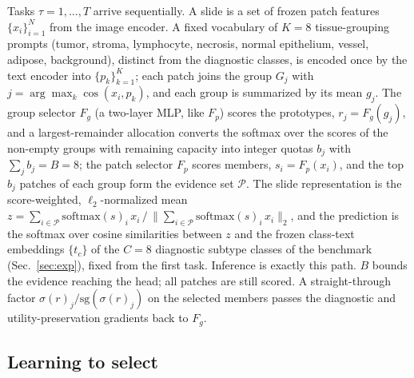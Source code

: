 \documentclass{article}
\newcommand{\Fg}{F_g}
\newcommand{\Fp}{F_p}
\newcommand{\Psel}{\mathcal{P}}
\begin{document}
Tasks $\tau=1,\ldots,T$ arrive sequentially. A slide is a set of frozen patch features $\{x_i\}_{i=1}^{N}$ from the image encoder. A fixed vocabulary of $K=8$ tissue-grouping prompts (tumor, stroma, lymphocyte, necrosis, normal epithelium, vessel, adipose, background), distinct from the diagnostic classes, is encoded once by the text encoder into $\{p_k\}_{k=1}^{K}$; each patch joins the group $G_j$ with $j=\arg\max_k\cos(x_i,p_k)$, and each group is summarized by its mean $g_j$. The group selector $\Fg$ (a two-layer MLP, like $\Fp$) scores the prototypes, $r_j=\Fg(g_j)$, and a largest-remainder allocation converts the softmax over the scores of the non-empty groups with remaining capacity into integer quotas $b_j$ with $\sum_j b_j=B=8$; the patch selector $\Fp$ scores members, $s_i=\Fp(x_i)$, and the top $b_j$ patches of each group form the evidence set $\Psel$. The slide representation is the score-weighted, $\ell_2$-normalized mean $z=\sum_{i\in\Psel}\mathrm{softmax}(s)_i\,x_i\,/\,\bigl\|\sum_{i\in\Psel}\mathrm{softmax}(s)_i\,x_i\bigr\|_2$, and the prediction is the softmax over cosine similarities between $z$ and the frozen class-text embeddings $\{t_c\}$ of the $C=8$ diagnostic subtype classes of the benchmark (Sec.~\ref{sec:exp}), fixed from the first task. Inference is exactly this path. $B$ bounds the evidence reaching the head; all patches are still scored. A straight-through factor $\sigma(r)_j/\mathrm{sg}(\sigma(r)_j)$ on the selected members passes the diagnostic and utility-preservation gradients back to $\Fg$.

\subsection{Learning to select}
\label{ssec:within}
\end{document}
